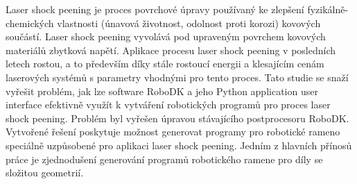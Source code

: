 ﻿%
Laser shock peening je proces povrchové úpravy používaný ke zlepšení fyzikálně-chemických vlastnosti (únavová životnost, odolnost proti korozi) kovových součástí. Laser shock peening vyvolává pod upraveným povrchem kovových materiálů zbytková napětí. Aplikace procesu laser shock peening v posledních letech rostou, a to především díky stále rostoucí energii a klesajícím cenám laserových systémů s parametry vhodnými pro tento proces. Tato studie se snaží vyřešit problém, jak lze software RoboDK a jeho Python application user interface efektivně využít k vytváření robotických programů pro proces laser shock peening. Problém byl vyřešen úpravou stávajícího postprocesoru RoboDK. Vytvořené řešení poskytuje možnost generovat programy pro robotické rameno speciálně uzpůsobené pro aplikaci laser shock peening. Jedním z hlavních přínosů práce je zjednodušení generování programů robotického ramene pro díly se složitou geometrií.


